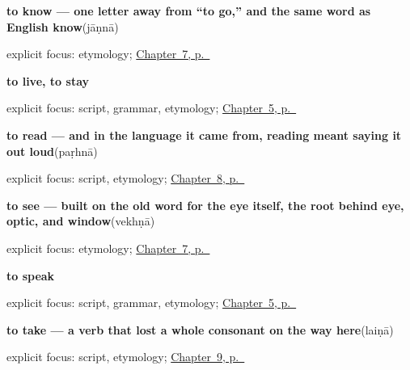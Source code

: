 \noindent\begin{minipage}[t]{\linewidth}
\raggedright
\textbf{to know — one letter away from “to go,” and the same word as English know}\enspace\emph{}\enspace(jāṇnā)\par
\footnotesize explicit focus: etymology; \hyperref[ch:pa-core-verbs]{Chapter~7, p.~\pageref*{ch:pa-core-verbs}}
\end{minipage}\par\smallskip

\noindent\begin{minipage}[t]{\linewidth}
\raggedright
\textbf{to live, to stay}\enspace\emph{}\par
\footnotesize explicit focus: script, grammar, etymology; \hyperref[ch:first-verbs]{Chapter~5, p.~\pageref*{ch:first-verbs}}
\end{minipage}\par\smallskip

\noindent\begin{minipage}[t]{\linewidth}
\raggedright
\textbf{to read — and in the language it came from, reading meant saying it out loud}\enspace\emph{}\enspace(paṛhnā)\par
\footnotesize explicit focus: script, etymology; \hyperref[ch:pa-mind-and-tone]{Chapter~8, p.~\pageref*{ch:pa-mind-and-tone}}
\end{minipage}\par\smallskip

\noindent\begin{minipage}[t]{\linewidth}
\raggedright
\textbf{to see — built on the old word for the eye itself, the root behind eye, optic, and window}\enspace\emph{}\enspace(vekhṇā)\par
\footnotesize explicit focus: etymology; \hyperref[ch:pa-core-verbs]{Chapter~7, p.~\pageref*{ch:pa-core-verbs}}
\end{minipage}\par\smallskip

\noindent\begin{minipage}[t]{\linewidth}
\raggedright
\textbf{to speak}\enspace\emph{}\par
\footnotesize explicit focus: script, grammar, etymology; \hyperref[ch:first-verbs]{Chapter~5, p.~\pageref*{ch:first-verbs}}
\end{minipage}\par\smallskip

\noindent\begin{minipage}[t]{\linewidth}
\raggedright
\textbf{to take — a verb that lost a whole consonant on the way here}\enspace\emph{}\enspace(laiṇā)\par
\footnotesize explicit focus: script, etymology; \hyperref[ch:pa-taking-and-liking]{Chapter~9, p.~\pageref*{ch:pa-taking-and-liking}}
\end{minipage}\par\smallskip


